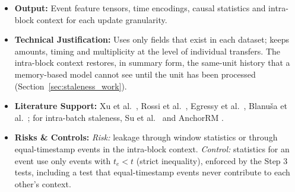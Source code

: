 \documentclass[11pt,a4paper]{article}
\begin{document}
\begin{itemize}[leftmargin=*]
\begin{enumerate}[leftmargin=*]
        \begin{equation}
            \psi(\mathcal{P}) = \Big[\log(1+|\mathcal{P}|) \,\Big\|\, \log\big(1+\textstyle\sum_{e'\in\mathcal{P}} a_{e'}\big) \,\Big\|\, \log(1+n_{\text{cp}}(\mathcal{P})) \,\Big\|\, \log\big(1+t-\min_{e'\in\mathcal{P}} t_{e'}\big)\Big],
        \end{equation}
        where $n_{\text{cp}}$ counts distinct counterparties (the last term is $0$ for an empty set), the context is
        \begin{equation}
            \mathbf{c}^{\text{IB}}_e = \big[\psi(\mathcal{P}^{\text{in}}_u)\,\|\,\psi(\mathcal{P}^{\text{out}}_u)\,\|\,\psi(\mathcal{P}^{\text{in}}_v)\,\|\,\psi(\mathcal{P}^{\text{out}}_v)\,\|\,\log(1+n_{uv}(e))\big],
        \end{equation}
        with $n_{uv}(e)$ the number of earlier transfers from $u$ to $v$ in the same unit. It is computed with segmented prefix sums after sorting the unit by account and time ($O(|U|\log|U|)$), uses only events with strictly earlier timestamps, and is $\mathbf{0}$ for the finest unit. Under block-based delivery, all transactions of a block become visible together, so this information is available at scoring time even though node memory has not yet been updated.
    \end{enumerate}
    \item \textbf{Output:} Event feature tensors, time encodings, causal statistics and intra-block context for each update granularity.
    \item \textbf{Technical Justification:} Uses only fields that exist in each dataset; keeps amounts, timing and multiplicity at the level of individual transfers. The intra-block context restores, in summary form, the same-unit history that a memory-based model cannot see until the unit has been processed (Section~\ref{sec:staleness_work}).
    \item \textbf{Literature Support:} Xu et al.\ \cite{xu2020tgat}, Rossi et al.\ \cite{rossi2020tgn}, Egressy et al.\ \cite{egressy2024multigraph}, Blanu\v{s}a et al.\ \cite{blanusa2024gfp}; for intra-batch staleness, Su et al.\ \cite{su2024pres} and AnchorRM \cite{anchorrm2026}.
    \item \textbf{Risks \& Controls:} \textit{Risk:} leakage through window statistics or through equal-timestamp events in the intra-block context. \textit{Control:} statistics for an event use only events with $t_e < t$ (strict inequality), enforced by the Step 3 tests, including a test that equal-timestamp events never contribute to each other's context.
\end{itemize}
\end{document}
